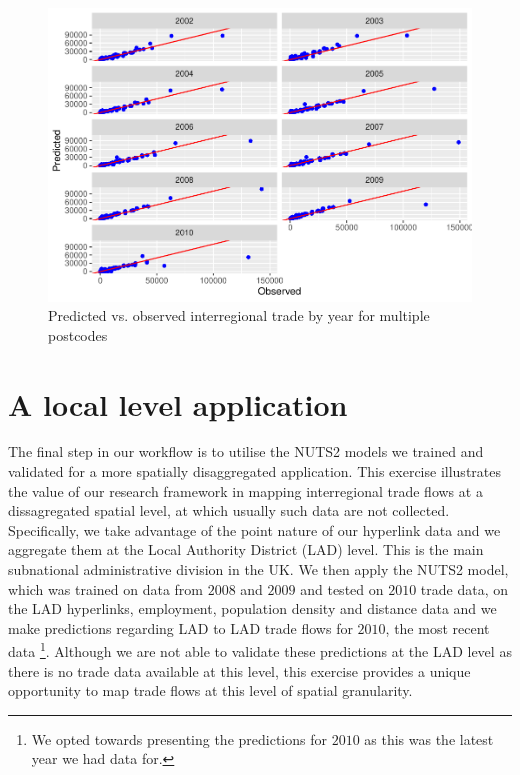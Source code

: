 \documentclass[]{interact}
\theoremstyle{plain}%
\theoremstyle{definition}
\theoremstyle{remark}
\begin{document}
\begin{figure}[p]
\includegraphics[width=1\linewidth]{hl_v2_files/figure-latex/unnamed-chunk-12-1} \caption{\label{prediction_multi_pc}Predicted vs. observed interregional trade by year for multiple postcodes}\label{fig:unnamed-chunk-12}
\end{figure}

\hypertarget{a-local-level-application}{%
\section{A local level application}\label{a-local-level-application}}

The final step in our workflow is to utilise the NUTS2 models we trained
and validated for a more spatially disaggregated application. This
exercise illustrates the value of our research framework in mapping
interregional trade flows at a dissagregated spatial level, at which
usually such data are not collected. Specifically, we take advantage of
the point nature of our hyperlink data and we aggregate them at the
Local Authority District (LAD) level. This is the main subnational
administrative division in the UK. We then apply the NUTS2 model, which
was trained on data from \(2008\) and \(2009\) and tested on \(2010\)
trade data, on the LAD hyperlinks, employment, population density and
distance data and we make predictions regarding LAD to LAD trade flows
for \(2010\), the most recent data \footnote{We opted towards presenting
  the predictions for \(2010\) as this was the latest year we had data
  for.}. Although we are not able to validate these predictions at the
LAD level as there is no trade data available at this level, this
exercise provides a unique opportunity to map trade flows at this level
of spatial granularity.
\end{document}
